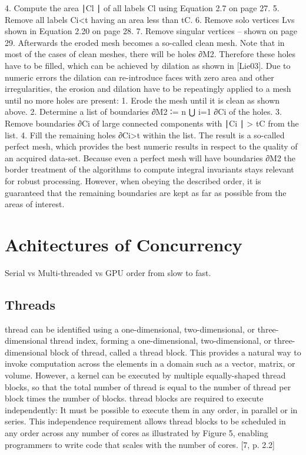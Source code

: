 4. Compute the area ∣Cl ∣ of all labels Cl using Equation 2.7 on page 27.
5. Remove all labels Ci<t having an area less than tC.
6. Remove solo vertices Lvs shown in Equation 2.20 on page 28.
7. Remove singular vertices – shown on page 29.
Afterwards the eroded mesh becomes a so-called clean mesh. Note that in most of
the cases of clean meshes, there will be holes ∂M2. Therefore these holes have
to be filled, which can be achieved by dilation as shown in [Lie03]. Due to
numeric errors the dilation can re-introduce faces with zero area and other
irregularities, the erosion and dilation have to be repeatingly applied to a mesh
until no more holes are present:
1. Erode the mesh until it is clean as shown above.
2. Determine a list of boundaries ∂M2 ∶= n ⋃ i=1 ∂Ci of the holes.
3. Remove boundaries ∂Ci of large connected components with ∣Ci ∣ > tC from the
list.
4. Fill the remaining holes ∂Ci>t within the list.
The result is a so-called perfect mesh, which provides the best numeric results
in respect to the quality of an acquired data-set. Because even a perfect mesh
will have boundaries ∂M2 the border treatment of the algorithms to compute
integral invariants stays relevant for robust processing. However, when obeying
the described order, it is guaranteed that the remaining boundaries are kept as
far as possible from the areas of interest.~\cite[p.~120]{Mara12}
%
%
%
\section{Achitectures of Concurrency}
Serial vs Multi-threaded vs GPU order from slow to fast.~\cite[p.~00]{todoCitation}
\todoCitation
%

\subsection{Threads}
thread can be identified using a one-dimensional, two-dimensional, or three-
dimensional thread index, forming a one-dimensional, two-dimensional, or three-
dimensional block of thread, called a thread block. This provides a natural way
to invoke computation across the elements in a domain such as a vector, matrix,
or volume. However, a kernel can be executed by multiple equally-shaped thread
blocks, so that the total number of thread is equal to the number of thread
per block times the number of blocks. thread blocks are required to execute
independently: It must be possible to execute them in any order, in parallel or
in series. This independence requirement allows thread blocks to be scheduled
in any order across any number of cores as illustrated by Figure 5, enabling
programmers to write code that scales with the number of cores. [7, p. 2.2]
%
%
%
